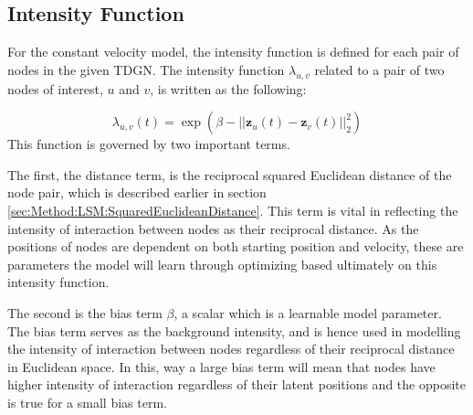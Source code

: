\subsection{Intensity Function}
\label{sec:Method:IntensityFunc}
For the constant velocity model, the intensity function is defined for each pair of nodes in the given TDGN.
The intensity function $\lambda_{u,v}$ related to a pair of two nodes of interest, $u$ and $v$, is written as the following:

\begin{equation}
    \lambda_{u,v}(t)
    =
    \exp \left(\beta - ||\textbf{z}_u(t) - \textbf{z}_v(t)||_2^2\right)
    \label{eq:IntensityFunc}
\end{equation}
This function is governed by two important terms.

The first, the distance term, is the reciprocal squared Euclidean distance of the node pair, which is described earlier in section \ref{sec:Method:LSM:SquaredEuclideanDistance}.
This term is vital in reflecting the intensity of interaction between nodes as their reciprocal distance.
As the positions of nodes are dependent on both starting position and velocity, these are parameters the model will learn through optimizing based ultimately on this intensity function.

The second is the bias term $\beta$, a scalar which is a learnable model parameter. 
The bias term serves as the background intensity, and is hence used in modelling the intensity of interaction between nodes regardless of their reciprocal distance in Euclidean space. 
In this, way a large bias term will mean that nodes have higher intensity of interaction regardless of their latent positions and the opposite is true for a small bias term.




